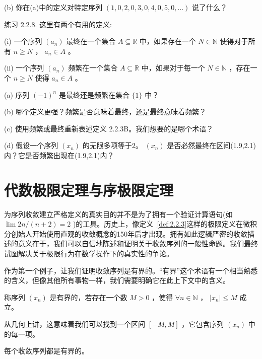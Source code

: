 (b) 你在(a)中的定义对特定序列 \(\left( {1,0,2,0,3,0,4,0,5,0,\ldots }\right)\) 说了什么？

练习 2.2.8. 这里有两个有用的定义:

(i) 一个序列 \(\left( {a}_{n}\right)\) 最终在一个集合 \(A \subseteq  \mathbb{R}\) 中，如果存在一个 \(N \in  \mathbb{N}\) 使得对于所有 \(n \geq  N\) ， \({a}_{n} \in  A\) 。

(ii) 一个序列 \(\left( {a}_{n}\right)\) 频繁在一个集合 \(A \subseteq  \mathbb{R}\) 中，如果对于每一个 \(N \in  \mathbb{N}\) ，存在一个 \(n \geq  N\) 使得 \({a}_{n} \in  A\) 。

(a) 序列 \({\left( -1\right) }^{n}\) 是最终还是频繁在集合 \(\{ 1\}\) 中？

(b) 哪个定义更强？频繁是否意味着最终，还是最终意味着频繁？

(c) 使用频繁或最终重新表述定义 2.2.3B。我们想要的是哪个术语？

(d) 假设一个序列 \(\left( {x}_{n}\right)\) 的无限多项等于2。 \(\left( {x}_{n}\right)\) 是否必然最终在区间(1.9,2.1)内？它是否频繁出现在(1.9,2.1)内？

\section{代数极限定理与序极限定理}
\label{sec:3.3}
为序列收敛建立严格定义的真实目的并不是为了拥有一个验证计算语句(如 \(\lim {2n}/\left( {n + 2}\right)  = 2\) )的工具。历史上，像定义~\ref{def:2.2.3}这样的极限定义在微积分创始人开始使用直观的收敛概念的150年后才出现。拥有如此逻辑严密的收敛描述的意义在于，我们可以自信地陈述和证明关于收敛序列的一般性命题。我们最终试图解决关于极限行为在数学操作下的真实性的争论。

作为第一个例子，让我们证明收敛序列是有界的。“有界”这个术语有一个相当熟悉的含义，但像其他所有事物一样，我们需要明确它在此上下文中的含义。

\begin{Def}
  \label{def:2.3.1}
  称序列 \(\left( {x}_{n}\right)\) 是有界的，若存在一个数 \(M > 0\) ，使得 \( \forall n \in  \mathbb{N}\) ， \(\left| {x}_{n}\right|  \leq  M\) 成立。
\end{Def}

从几何上讲，这意味着我们可以找到一个区间 \(\left\lbrack  {-M,M}\right\rbrack\) ，它包含序列 \(\left( {x}_{n}\right)\) 中的每一项。

\begin{Thm}
  \label{thm:2.3.2}
  每个收敛序列都是有界的。
\end{Thm}

